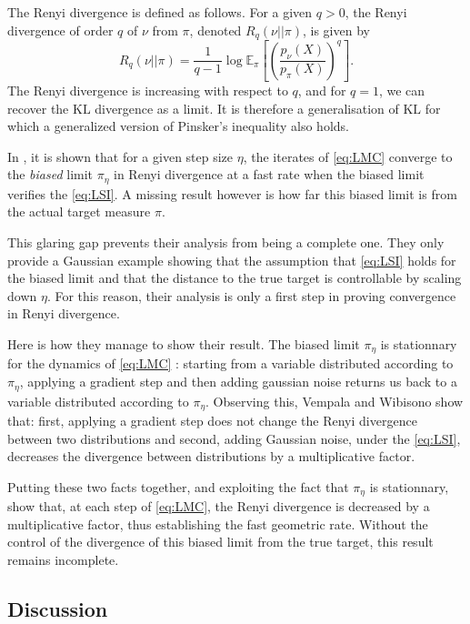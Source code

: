 \documentclass[11pt,twoside]{article}
\theoremstyle{definition}
\newcommand{\E}{\mathbb{E}}
\newcommand{\KL}{\text{KL}}
\begin{document}
The Renyi divergence is defined as follows. For a given $q > 0$, the Renyi divergence of order $q$ of $\nu$ from $\pi$, denoted $R_q(\nu || \pi)$, is given by
\[
R_q(\nu || \pi) = \frac{1}{q-1}\log\E_\pi\left[\left( \frac{p_{\nu}(X)}{p_\pi(X)}\right)^q\right].
\]
The Renyi divergence is increasing with respect to $q$, and for $q=1$, we can recover the $\KL$ divergence as a limit. It is therefore a generalisation of $\KL$ for which a generalized version of Pinsker's inequality also holds.

In \cite{vempala_rapid_2019}, it is shown that for a given step size $\eta$, the iterates of \eqref{eq:LMC} converge to the \textit{biased} limit $\pi_\eta$ in Renyi divergence at a fast rate when the biased limit verifies the \eqref{eq:LSI}. A missing result however is how far this biased limit is from the actual target measure $\pi$.

This glaring gap prevents their analysis from being a complete one. They only provide a Gaussian example showing that the assumption that \eqref{eq:LSI} holds for the biased limit and that the distance to the true target is controllable by scaling down $\eta$. For this reason, their analysis is only a first step in proving convergence in Renyi divergence.

Here is how they manage to show their result. The biased limit $\pi_\eta$ is stationnary for the dynamics of \eqref{eq:LMC} : starting from a variable distributed according to $\pi_\eta$, applying a gradient step and then adding gaussian noise returns us back to a variable distributed according to $\pi_\eta$. Observing this, Vempala and Wibisono show that: first, applying a gradient step does not change the Renyi divergence between two distributions and second, adding Gaussian noise, under the \eqref{eq:LSI}, decreases the divergence between distributions by a multiplicative factor.

Putting these two facts together, and exploiting the fact that $\pi_\eta$ is stationnary, \cite{vempala_rapid_2019} show that, at each step of \eqref{eq:LMC}, the Renyi divergence is decreased by a multiplicative factor, thus establishing the fast geometric rate. Without the control of the divergence of this biased limit from the true target, this result remains incomplete.

\subsection{Discussion}
\end{document}
